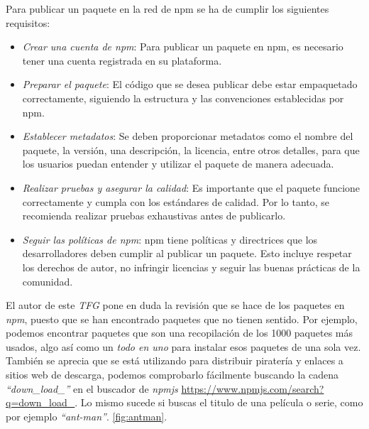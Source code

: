 Para publicar un paquete en la red de npm se ha de cumplir los siguientes requisitos:

\begin{itemize}
    \item \textit{Crear una cuenta de npm}: Para publicar un paquete en npm, es necesario tener una cuenta registrada en su plataforma.

    \item \textit{Preparar el paquete}: El código que se desea publicar debe estar empaquetado correctamente, siguiendo la estructura y las convenciones establecidas por npm.

    \item \textit{Establecer metadatos}: Se deben proporcionar metadatos como el nombre del paquete, la versión, una descripción, la licencia, entre otros detalles, para que los usuarios puedan entender y utilizar el paquete de manera adecuada.

    \item \textit{Realizar pruebas y asegurar la calidad}: Es importante que el paquete funcione correctamente y cumpla con los estándares de calidad. Por lo tanto, se recomienda realizar pruebas exhaustivas antes de publicarlo.

    \item \textit{Seguir las políticas de npm}: npm tiene políticas y directrices que los desarrolladores deben cumplir al publicar un paquete. Esto incluye respetar los derechos de autor, no infringir licencias y seguir las buenas prácticas de la comunidad.
\end{itemize}

El autor de este \textit{TFG} pone en duda la revisión que se hace de los paquetes
en \textit{npm}, puesto que se han encontrado paquetes que no tienen sentido.
Por ejemplo,
podemos encontrar paquetes que son una recopilación de los 1000 paquetes más usados, algo
así como un \textit{todo en uno} para instalar esos paquetes de una sola vez.
También se aprecia que se está utilizando para distribuir piratería y enlaces a sitios web
de descarga, podemos comprobarlo fácilmente buscando la cadena \textit{``down\_load\_''} en
el buscador de \textit{npmjs} \url{https://www.npmjs.com/search?q=down\_load\_}.
Lo mismo sucede si buscas el titulo de una película o serie, como por ejemplo \textit{``ant-man''}. \ref{fig:antman}.


